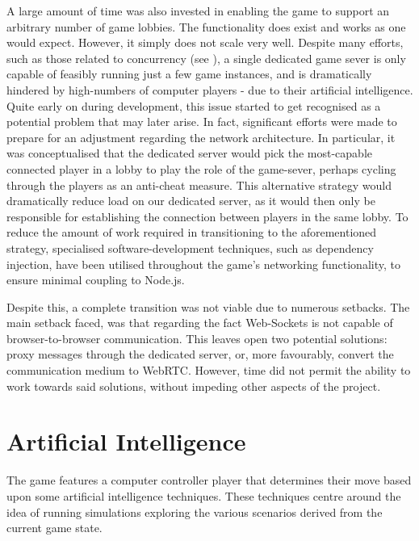 \documentclass{standalone}
\begin{document}
		A large amount of time was also invested in enabling the game to support an arbitrary number of game lobbies. The functionality does exist and works as one would expect. However, it simply does not scale very well. Despite many efforts, such as those related to concurrency (see ), a single dedicated game sever is only capable of feasibly running just a few game instances, and is dramatically hindered by high-numbers of computer players - due to their artificial intelligence. Quite early on during development, this issue started to get recognised as a potential problem that may later arise. In fact, significant efforts were made to prepare for an adjustment regarding the network architecture. In particular, it was conceptualised that the dedicated server would pick the most-capable connected player in a lobby to play the role of the game-sever, perhaps cycling through the players as an anti-cheat measure. This alternative strategy would dramatically reduce load on our dedicated server, as it would then only be responsible for establishing the connection between players in the same lobby. To reduce the amount of work required in transitioning to the aforementioned strategy, specialised software-development techniques, such as dependency injection, have been utilised throughout the game's networking functionality, to ensure minimal coupling to Node.js.

		Despite this, a complete transition was not viable due to numerous setbacks. The main setback faced, was that regarding the fact Web-Sockets is not capable of browser-to-browser communication. This leaves open two potential solutions: proxy messages through the dedicated server, or, more favourably, convert the communication medium to WebRTC. However, time did not permit the ability to work towards said solutions, without impeding other aspects of the project.

	\section{Artificial Intelligence}
		The game features a computer controller player that determines their move based upon some artificial intelligence techniques. These techniques centre around the idea of running simulations exploring the various scenarios derived from the current game state.
\end{document}
